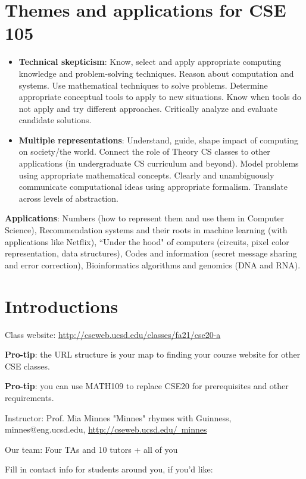 \section*{Themes and applications for CSE 105}
\begin{itemize}
\item {\bf Technical skepticism}: Know, select and apply appropriate computing knowledge and problem-solving techniques. 
Reason about computation and systems. 
Use mathematical techniques to solve problems. 
Determine appropriate conceptual tools to apply to new situations. 
Know when tools do not apply and try different approaches. 
Critically analyze and evaluate candidate solutions.
\item {\bf Multiple representations}: Understand, guide, shape impact of computing on society/the world. 
Connect the role of Theory CS classes to other applications (in undergraduate CS curriculum and beyond). 
Model problems using appropriate mathematical concepts.
Clearly and unambiguously communicate computational ideas using appropriate formalism. 
Translate across levels of abstraction.
\end{itemize}

{\bf Applications}: Numbers (how to represent them and use them in Computer Science), 
Recommendation systems and their roots in machine learning (with applications like Netflix),
``Under the hood" of computers (circuits, pixel color representation, data structures),
Codes and information (secret message sharing and error correction),
Bioinformatics algorithms and genomics (DNA and RNA).

\section*{Introductions}
Class website: \href{http://cseweb.ucsd.edu/classes/fa21/cse20-a}{http://cseweb.ucsd.edu/classes/fa21/cse20-a}

{\bf Pro-tip}: the URL structure is your map to finding your course website for other CSE classes.

{\bf Pro-tip}: you can use MATH109 to replace CSE20 for prerequisites and other requirements.

Instructor: Prof. Mia Minnes {\tiny{"Minnes" rhymes with Guinness}}, minnes@eng.ucsd.edu, 
\href{http://cseweb.ucsd.edu/~minnes}{http://cseweb.ucsd.edu/~minnes}

Our team: Four TAs and 10 tutors + all of you

Fill in contact info for students around you, if you'd like:
\vspace{50pt}


